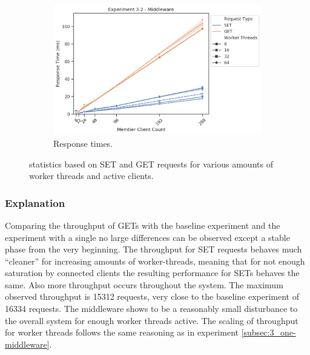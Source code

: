 \begin{figure}
{\begin{subfigure}[t!]{0.55\textwidth}
                    \includegraphics[width=1\textwidth]{../data_analysis/figures/3-2_mw_response_time.png}
                    \caption{Response times.\label{fig:double_mw_rt}}
                \end{subfigure}
            }
            \caption{\mw{} statistics based on SET and GET requests for various amounts of worker threads and active
                     clients.\label{fig:double_mw_all}}
        \end{figure}

        \subsubsection{Explanation\label{subsubsec:3_two-middlewares_summary}}

            Comparing the throughput of GETs with the baseline experiment and the experiment with a single \mw{} no
            large differences can be observed except a stable phase from the very beginning. The throughput for SET
            requests behaves much ``cleaner'' for increasing amounts of worker-threads, meaning that for not enough
            saturation by connected clients the resulting performance for SETs behaves the same. Also more throughput
            occurs throughout the system. The maximum observed throughput is 15312 requests, very close to the baseline
            experiment of 16334 requests. The middleware shows to be a reasonably small disturbance to the overall
            system for enough worker threads active. The scaling of throughput for worker threads follows the same
            reasoning as in experiment \ref{subsec:3_one-middleware}.

